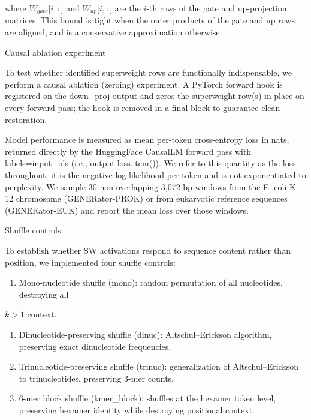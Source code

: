 \documentclass[11pt]{article}
\begin{document}
where \(W_{gate}\lbrack i,:\rbrack\) and \(W_{up}\lbrack i,:\rbrack\)
are the \(i\)-th rows of the gate and up-projection matrices. This bound
is tight when the outer products of the gate and up rows are aligned,
and is a conservative approximation otherwise.

Causal ablation experiment

To test whether identified superweight rows are functionally
indispensable, we perform a causal ablation (zeroing) experiment. A
PyTorch forward hook is registered on the down\_proj output and zeros
the superweight row(s) in-place on every forward pass; the hook is
removed in a final block to guarantee clean restoration.

Model performance is measured as mean per-token cross-entropy loss in
nats, returned directly by the HuggingFace CausalLM forward pass with
labels=input\_ids (i.e., output.loss.item()). We refer to this quantity
as the loss throughout; it is the negative log-likelihood per token and
is not exponentiated to perplexity. We sample 30 non-overlapping
3,072-bp windows from the E. coli K-12 chromosome (GENERator-PROK) or
from eukaryotic reference sequences (GENERator-EUK) and report the mean
loss over those windows.

Shuffle controls

To establish whether SW activations respond to sequence content rather
than position, we implemented four shuffle controls:

\begin{enumerate}
\def\labelenumi{\arabic{enumi})}
\item
  Mono-nucleotide shuffle (mono): random permutation of all nucleotides,
  destroying all
\end{enumerate}

\(k > 1\) context.

\begin{enumerate}
\def\labelenumi{\arabic{enumi})}
\setcounter{enumi}{1}
\item
  Dinucleotide-preserving shuffle (dinuc): Altschul--Erickson algorithm,
  preserving exact dinucleotide frequencies.
\item
  Trinucleotide-preserving shuffle (trinuc): generalization of
  Altschul--Erickson to trinucleotides, preserving 3-mer counts.
\item
  6-mer block shuffle (kmer\_block): shuffles at the hexamer token
  level, preserving hexamer identity while destroying positional
  context.
\end{enumerate}
\end{document}
